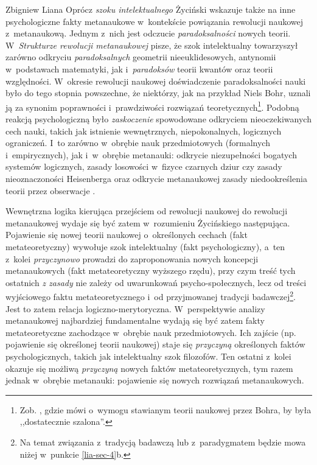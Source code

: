 \begin{artplenv}{Zbigniew Liana}
Oprócz \textit{szoku intelektualnego} Życiński wskazuje także na inne psychologiczne fakty metanaukowe w~kontekście
powiązania rewolucji naukowej z~metanaukową. Jednym z~nich jest odczucie \textit{paradoksalności} nowych teorii. W~\textit{Strukturze
rewolucji metanaukowej} pisze, że szok intelektualny towarzyszył zarówno odkryciu
\textit{paradoksalnych} geometrii nieeuklidesowych, antynomii w~podstawach matematyki, jak i~\textit{paradoksów} teorii
kwantów oraz teorii względności. W~okresie rewolucji naukowej doświadczenie paradoksalności nauki było do tego stopnia
powszechne, że niektórzy, jak na przykład Niels Bohr, uznali ją za synonim poprawności i~prawdziwości rozwiązań
teoretycznych\footnote{Zob.
\parencites[s.~9,132]{zycinski_structure_1988}[s.~16,233]{zycinski_struktura_2013},
gdzie mówi o~wymogu
stawianym teorii naukowej przez Bohra, by była ,,dostatecznie szalona''.}. Podobną reakcją psychologiczną było
\textit{zaskoczenie} spowodowane odkryciem nieoczekiwanych cech nauki, takich jak istnienie wewnętrznych, niepokonalnych,
logicznych ograniczeń. I~to zarówno w~obrębie nauk przedmiotowych (formalnych i~empirycznych), jak i~w~obrębie
metanauki: odkrycie niezupełności bogatych systemów logicznych, zasady losowości w~fizyce czarnych dziur czy zasady
nieoznaczoności Heisenberga oraz odkrycie metanaukowej zasady niedookreślenia teorii przez obserwacje
\parencites[s.~11]{zycinski_structure_1988}[s.~20]{zycinski_struktura_2013}.

Wewnętrzna logika kierująca przejściem od rewolucji naukowej do rewolucji metanaukowej wydaje się być zatem w~rozumieniu
Życińskiego następująca. Pojawienie się nowej teorii naukowej o~określonych cechach (fakt metateoretyczny) wywołuje
szok intelektualny (fakt psychologiczny), a~ten z~kolei \textit{przyczynowo} prowadzi do zaproponowania nowych koncepcji
metanaukowych (fakt metateoretyczny wyższego rzędu), przy czym treść tych ostatnich \textit{z zasady }nie zależy od
uwarunkowań psycho-społecznych, lecz od treści wyjściowego faktu metateoretycznego i~od przyjmowanej tradycji
badawczej\footnote{Na temat związania z~tradycją badawczą lub z~paradygmatem będzie mowa niżej w~punkcie \ref{lia-sec-4}b.}. Jest to
zatem relacja logiczno-merytoryczna. W~perspektywie analizy metanaukowej najbardziej fundamentalne wydają się być zatem
fakty metateoretyczne zachodzące w~obrębie nauk przedmiotowych. Ich zajście (np. pojawienie się określonej teorii
naukowej) staje się \textit{przyczyną} określonych faktów psychologicznych, takich jak intelektualny szok filozofów. Ten
ostatni z~kolei okazuje się możliwą \textit{przyczyną} nowych faktów metateoretycznych, tym razem jednak w~obrębie
metanauki: pojawienie się nowych rozwiązań metanaukowych.


\end{artplenv}
